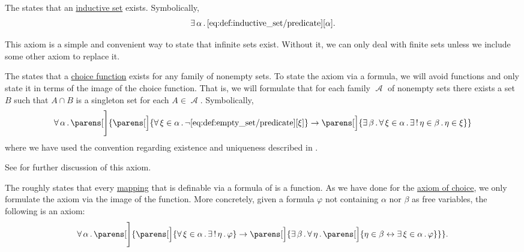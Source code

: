 \begin{definition}
\begin{thmenum}
     The  states that an \hyperref[def:inductive_set]{inductive set} exists. Symbolically,
    \begin{equation}\label{eq:def:zfc/infinity}
      \exists \thinspace \alpha \thinspace . \thinspace \ref{eq:def:inductive_set/predicate}[\alpha].
    \end{equation}

    This axiom is a simple and convenient way to state that infinite sets exist. Without it, we can only deal with finite sets unless we include some other axiom to replace it.

     The  states that a \hyperref[def:choice_function]{choice function} exists for any family of nonempty sets. To state the axiom via a formula, we will avoid functions and only state it in terms of the image of the choice function. That is, we will formulate that for each family \( \mscrA \) of nonempty sets there exists a set \( B \) such that \( A \cap B \) is a singleton set for each \( A \in \mscrA \). Symbolically,
    \begin{equation}\label{eq:def:zfc/choice}
      \qforall \alpha \parens[\Bigg]
        {
          \parens[\Big]{ \qforall {\xi \in \alpha} \neg \ref{eq:def:empty_set/predicate}[\xi] }
          \rightarrow
          \parens[\Big]{ \qexists \beta \qforall {\xi \in \alpha} \qExists {\eta \in \beta} \eta \in \xi }
        }
    \end{equation}
    where we have used the convention regarding existence and uniqueness described in .

    See  for further discussion of this axiom.

     The  roughly states that every \hyperref[rem:function_definition]{mapping} that is definable via a formula of  is a function. As we have done for the \hyperref[def:zfc/choice]{axiom of choice}, we only formulate the axiom via the image of the function. More concretely, given a formula \( \varphi \) not containing \( \alpha \) nor \( \beta \) as free variables, the following is an axiom:
    \begin{equation}\label{eq:def:zfc/replacement}
      \qforall \alpha \parens[\Bigg]
        {
          \parens[\Big]{ \qforall {\xi \in \alpha} \qExists \eta \varphi }
          \rightarrow
          \parens[\Big]{ \qexists \beta \qforall \eta \parens[\Big]{ \eta \in \beta \leftrightarrow \qexists {\xi \in \alpha} \varphi } }
        }.
    \end{equation}


\end{thmenum}
\end{definition}
